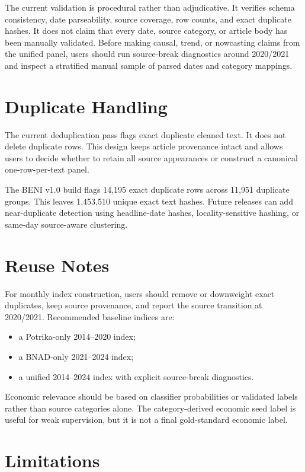 \documentclass[11pt]{article}
\begin{document}
The current validation is procedural rather than adjudicative. It verifies schema consistency, date parseability, source coverage, row counts, and exact duplicate hashes. It does not claim that every date, source category, or article body has been manually validated. Before making causal, trend, or nowcasting claims from the unified panel, users should run source-break diagnostics around 2020/2021 and inspect a stratified manual sample of parsed dates and category mappings.

\section{Duplicate Handling}

The current deduplication pass flags exact duplicate cleaned text. It does not delete duplicate rows. This design keeps article provenance intact and allows users to decide whether to retain all source appearances or construct a canonical one-row-per-text panel.

The BENI v1.0 build flags 14,195 exact duplicate rows across 11,951 duplicate groups. This leaves 1,453,510 unique exact text hashes. Future releases can add near-duplicate detection using headline-date hashes, locality-sensitive hashing, or same-day source-aware clustering.

\section{Reuse Notes}

For monthly index construction, users should remove or downweight exact duplicates, keep source provenance, and report the source transition at 2020/2021. Recommended baseline indices are:

\begin{itemize}
  \item a Potrika-only 2014--2020 index;
  \item a BNAD-only 2021--2024 index;
  \item a unified 2014--2024 index with explicit source-break diagnostics.
\end{itemize}

Economic relevance should be based on classifier probabilities or validated labels rather than source categories alone. The category-derived economic seed label is useful for weak supervision, but it is not a final gold-standard economic label.

\section{Limitations}
\end{document}
